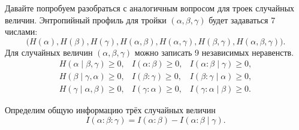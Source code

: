 \documentclass[12pt]{article}
\begin{document}
Давайте попробуем разобраться с аналогичным вопросом для троек случайных
величин. Энтропийный профиль для тройки $(\alpha,\beta,\gamma)$ будет задаваться 7 числами:
\[
\bigl(H(\alpha),H(\beta),H(\gamma),H(\alpha,\beta),H(\alpha,\gamma),
H(\beta,\gamma),H(\alpha,\beta,\gamma)\bigr).
\]
Для случайных величин $(\alpha,\beta,\gamma)$ можно записать 9 независимых
неравенств.
\begin{equation*}
\begin{array}{lll}
H(\alpha\mid\beta,\gamma)\ge 0, & I(\alpha:\beta )\ge 0, & I(\alpha:\beta\mid\gamma) \ge 0,\\
H(\beta\mid\gamma,\alpha)\ge 0, & I(\beta:\gamma )\ge 0, & I(\beta:\gamma\mid\alpha) \ge 0,\\
H(\gamma\mid\alpha,\beta)\ge 0, & I(\gamma:\alpha)\ge 0, & I(\gamma:\alpha\mid\beta) \ge 0.
\end{array}
\end{equation*}
\begin{definition}
Определим общую информацию трёх случайных величин
\[
    I(\alpha:\beta:\gamma) = I(\alpha:\beta) - I(\alpha:\beta\mid\gamma).
\]
\end{definition}
\end{document}
